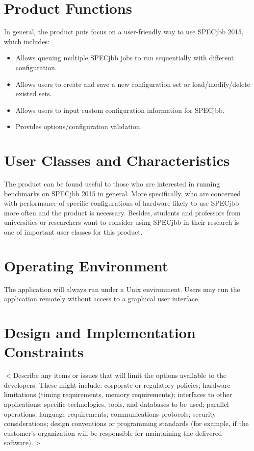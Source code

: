 \documentclass{scrreprt}
\begin{document}
\section{Product Functions}
In general, the product puts focus on a user-friendly way to use SPECjbb 2015, which includes:
\begin{itemize}
	\item Allows queuing multiple SPECjbb jobs to run sequentially with different configuration.
	\item Allows users to create and save a new configuration set or load/modify/delete existed sets.
	\item Allows users to input custom configuration information for SPECjbb.
	\item Provides options/configuration validation.
\end{itemize}

\section{User Classes and Characteristics}
The product can be found useful to those who are interested in running benchmarks on SPECjbb 2015 in general. More specifically, who are concerned with performance of specific configurations of hardware likely to use SPECjbb more often and the product is necessary. Besides, students and professors from universities or researchers want to consider using SPECjbb in their research is one of important user classes for this product.

\section{Operating Environment}
The application will always run under a Unix environment. Users may run the application remotely without access to a graphical user interface.

\section{Design and Implementation Constraints}
$<$Describe any items or issues that will limit the options available to the 
developers. These might include: corporate or regulatory policies; hardware 
limitations (timing requirements, memory requirements); interfaces to other 
applications; specific technologies, tools, and databases to be used; parallel 
operations; language requirements; communications protocols; security 
considerations; design conventions or programming standards (for example, if the 
customer’s organization will be responsible for maintaining the delivered 
software).$>$
\end{document}
